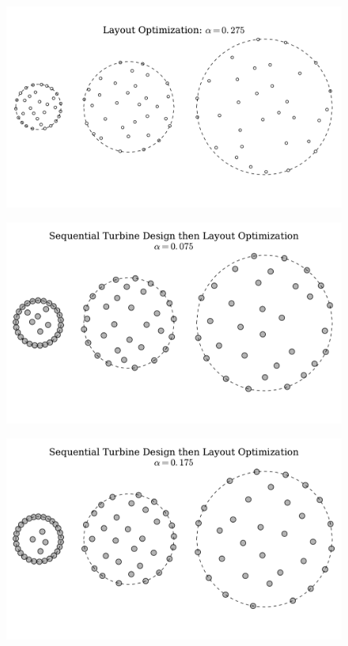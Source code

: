 \begin{figure}[htbp]
  \centering
  \includegraphics[width=\textwidth]{Figures/CircleLayoutL_0_275.pdf}
  \caption{\label{circ275L}}
\end{figure}


\begin{figure}[htbp]
  \centering
  \includegraphics[width=\textwidth]{Figures/CircleLayoutS_0_075.pdf}
  \caption{\label{circ75S}}
\end{figure}

\begin{figure}[htbp]
  \centering
  \includegraphics[width=\textwidth]{Figures/CircleLayoutS_0_175.pdf}
  \caption{\label{circ175S}}
\end{figure}

